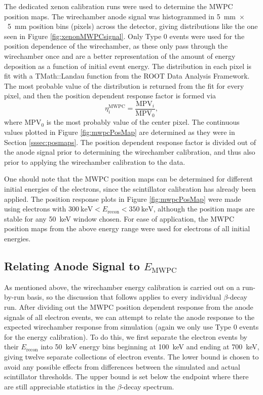 The dedicated xenon calibration runs were used to determine the MWPC position maps.
The wirechamber anode signal was histogrammed in 5~mm~$\times$~5~mm position bins (pixels) across the detector,
giving distributions like the one seen in Figure \ref{fig:xenonMWPCsignal}. Only Type 0 events were used
for the position dependence of the wirechamber, as these only pass through the wirechamber once and are a better
representation of the amount of energy deposition as a function of initial event energy. The distribution
in each pixel is fit with a TMath::Landau function from the ROOT Data Analysis Framework.
The most probable value of
the distribution is returned from the fit for every pixel, and then the position dependent response factor is formed
via
%
\begin{equation}
  \eta^{\mathrm{MWPC}}_i = \frac{\mathrm{MPV}_i}{\mathrm{MPV}_0},
\end{equation}
where $\mathrm{MPV}_0$ is the most probably value of the center pixel.
The continuous values plotted in Figure \ref{fig:mwpcPosMap} are determined as they were in
Section \ref{sssec:posmaps}. The position dependent response factor is divided out of the anode signal
prior to determining the wirechamber calibration, and thus also prior to applying the wirechamber
calibration to the data.

One should note that the MWPC position maps can be determined for different initial energies of the
electrons, since the scintillator calibration has already been applied. The position response plots
in Figure \ref{fig:mwpcPosMap} were made using electrons with $300\mathrm{~keV}<E_{\mathrm{recon}}<350\mathrm{~keV}$,
although the position maps are stable for any 50~keV window chosen. For ease of application, the MWPC position
maps from the above energy range were used for electrons of all initial energies.


\subsection{Relating Anode Signal to $E_{\mathrm{MWPC}}$}

As mentioned above, the wirechamber energy calibration is carried out on a run-by-run basis, so
the discussion that follows applies to every individual $\beta$-decay run.
After dividing out the MWPC position dependent response from the anode signals of all electron events,
we can attempt to relate the anode response to the expected wirechamber response from simulation (again
we only use Type 0 events for the energy calibration). 
To do this, we first separate the electron events by their $E_{\mathrm{recon}}$ into 50~keV energy bins beginning at 100~keV and ending at
700~keV, giving twelve separate collections of electron events. The lower bound is chosen to avoid any possible
effects from differences between the simulated and actual scintillator thresholds. The upper bound is set below the endpoint
where there are still appreciable statistics in the $\beta$-decay spectrum.

